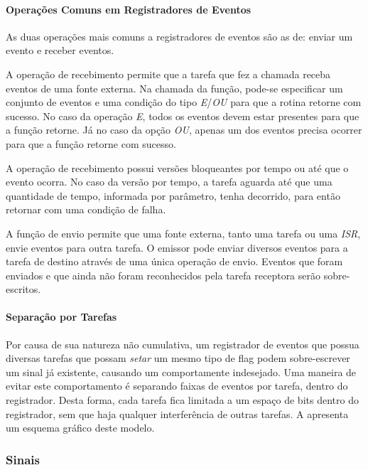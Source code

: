 \paragraph{Operações Comuns em Registradores de Eventos}

As duas operações mais comuns a registradores de eventos são as de: enviar um evento e receber eventos.

A operação de recebimento permite que a tarefa que fez a chamada receba eventos de uma fonte externa. Na chamada da função, pode-se especificar um conjunto de eventos e uma condição do tipo \emph{E}/\emph{OU} para que a rotina retorne com sucesso. No caso da operação \emph{E}, todos os eventos devem estar presentes para que a função retorne. Já no caso da opção \emph{OU}, apenas um dos eventos precisa ocorrer para que a função retorne com sucesso.

A operação de recebimento possui versões bloqueantes por tempo ou até que o evento ocorra. No caso da versão por tempo, a tarefa aguarda até que uma quantidade de tempo, informada por parâmetro, tenha decorrido, para então retornar com uma condição de falha.

A função de envio permite que uma fonte externa, tanto uma tarefa ou uma \emph{ISR}, envie eventos para outra tarefa. O emissor pode enviar diversos eventos para a tarefa de destino através de uma única operação de envio. Eventos que foram enviados e que ainda não foram reconhecidos pela tarefa receptora serão sobre-escritos.

\paragraph{Separação por Tarefas}

Por causa de sua natureza não cumulativa, um registrador de eventos que possua diversas tarefas que possam \emph{setar} um mesmo tipo de flag podem sobre-escrever um sinal já existente, causando um comportamente indesejado. Uma maneira de evitar este comportamento é separando faixas de eventos por tarefa, dentro do registrador. Desta forma, cada tarefa fica limitada a um espaço de bits dentro do registrador, sem que haja qualquer interferência de outras tarefas. A  apresenta um esquema gráfico deste modelo.


\subsubsection{Sinais}



